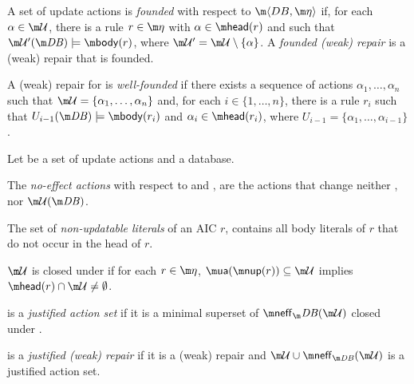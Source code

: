 {\begin{definition}
 A set of update actions \UU is \emph{founded} with respect to $\fulldb$ if, for each $\alpha \in \UU$, there is a rule  $r\in \aics$ with $\alpha\in\head(r)$ and such that $\UU'(\db)\models \body(r)$, where $\UU'=\UU\setminus\{\alpha\}$. A \emph{founded (weak) repair} is a (weak) repair that is founded.
\end{definition}

\begin{definition}
 A (weak) repair \UU for \fulldb is \emph{well-founded} if there exists a sequence of actions $\alpha_1,\dots,\alpha_n$ such that $\UU=\{\alpha_1,\dots,\alpha_n\}$ and, for each $i\in\{1,\dots,n\}$, there is a rule $r_i$ such that $U_{i-1}(\db) \models \body (r_i)$ and $\alpha_i \in \head(r_i)$, where $U_{i-1} = \{\alpha_1,\dots,\alpha_{i-1}\}$.
\end{definition}

\begin{definition}
  Let \UU be a set of update actions and \fulldb a database. 
  \begin{compactitem}
   \item The \emph{no-effect actions} with respect to \db and \UU, \shortpaper{$\neff_\db(\UU)$, }are the actions that change neither \db, nor $\UU(\db)$.
   \item The set of \emph{non-updatable literals} of an AIC $r$, contains all body literals of $r$ that do not occur in the head of $r$.
     \longpaper{\[\nup(r) = \body(r) \setminus \litof\left(\head(r)^D\right)\,.\]}
   \item $\UU$ is closed under \aics if for each $r\in \aics$, $\actof(\nup(r))\subseteq \UU$ implies $\head(r)\cap \UU\neq \emptyset$.
   \item \UU is a \emph{justified action set} if it is a minimal superset of $\neff_\db(\UU)$ closed under \aics.
   \item \UU is a \emph{justified (weak) repair} if it is a (weak) repair and $\UU\cup \neff_{\db}(\UU)$ is a justified action set. 
  \end{compactitem}


\end{definition}}

